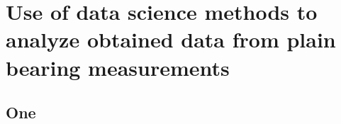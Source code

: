 \chapter{Use of data science methods to analyze obtained data from plain bearing measurements}

\section{One}
